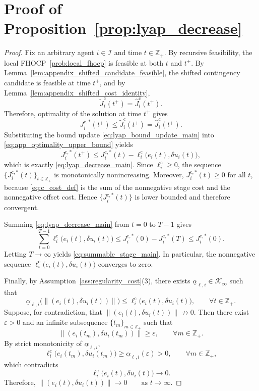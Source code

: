 \documentclass[twocolumn]{autart}
\begin{document}
\section{Proof of Proposition~\ref{prop:lyap_decrease}}

\begin{proof}
Fix an arbitrary agent $i\in\mathcal I$ and time $t\in\mathbb Z_+$.
By recursive feasibility, the local FHOCP~\eqref{prob:local_fhocp} is feasible at both $t$ and $t^+$.
By Lemma~\ref{lem:appendix_shifted_candidate_feasible}, the shifted contingency candidate is feasible at time $t^+$, and by Lemma~\ref{lem:appendix_shifted_cost_identity},
\[
\tilde J_i^{\mathrm c}(t^+)=\hat J_i^{\mathrm c}(t^+).
\]
Therefore, optimality of the solution at time $t^+$ gives
\begin{equation}
J_i^{\mathrm c,\ast}(t^+)
\le
\tilde J_i^{\mathrm c}(t^+)
=
\hat J_i^{\mathrm c}(t^+).
\label{eq:app_optimality_upper_bound}
\end{equation}
Substituting the bound update \eqref{eq:lyap_bound_update_main} into \eqref{eq:app_optimality_upper_bound} yields
\[
J_i^{\mathrm c,\ast}(t^+)
\le
J_i^{\mathrm c,\ast}(t)
-
\ell_i^{\mathrm c}\!\bigl(e_i(t),\delta u_i(t)\bigr),
\]
which is exactly \eqref{eq:lyap_decrease_main}.
Since $\ell_i^{\mathrm c}\ge 0$, the sequence $\{J_i^{\mathrm c,\ast}(t)\}_{t\in\mathbb Z_+}$ is monotonically nonincreasing.
Moreover, $J_i^{\mathrm c,\ast}(t)\ge 0$ for all $t$, because \eqref{eq:c_cost_def} is the sum of the nonnegative stage cost and the nonnegative offset cost.
Hence $\{J_i^{\mathrm c,\ast}(t)\}$ is lower bounded and therefore convergent.

Summing \eqref{eq:lyap_decrease_main} from $t=0$ to $T-1$ gives
\begin{equation}
\sum_{t=0}^{T-1}
\ell_i^{\mathrm c}\!\bigl(e_i(t),\delta u_i(t)\bigr)
\le
J_i^{\mathrm c,\ast}(0)-J_i^{\mathrm c,\ast}(T)
\le
J_i^{\mathrm c,\ast}(0).
\label{eq:app_telescoping_sum}
\end{equation}
Letting $T\to\infty$ yields \eqref{eq:summable_stage_main}.
In particular, the nonnegative sequence
$\ell_i^{\mathrm c}\!\bigl(e_i(t),\delta u_i(t)\bigr)$ converges to zero.

Finally, by Assumption~\ref{ass:regularity_cost}(3), there exists
$\underline{\alpha}_{\ell,i}\in\mathcal K_\infty$ such that
\[
\underline{\alpha}_{\ell,i}\!\bigl(\|(e_i(t),\delta u_i(t))\|\bigr)
\le
\ell_i^{\mathrm c}\!\bigl(e_i(t),\delta u_i(t)\bigr),
\qquad \forall t\in\mathbb Z_+.
\]
Suppose, for contradiction, that $\|(e_i(t),\delta u_i(t))\|\not\to 0$.
Then there exist $\varepsilon>0$ and an infinite subsequence $\{t_m\}_{m\in\mathbb Z_+}$ such that
\[
\|(e_i(t_m),\delta u_i(t_m))\|\ge \varepsilon,
\qquad \forall m\in\mathbb Z_+.
\]
By strict monotonicity of $\underline{\alpha}_{\ell,i}$,
\[
\ell_i^{\mathrm c}\!\bigl(e_i(t_m),\delta u_i(t_m)\bigr)
\ge
\underline{\alpha}_{\ell,i}(\varepsilon)
>0,
\qquad \forall m\in\mathbb Z_+,
\]
which contradicts
\[
\ell_i^{\mathrm c}\!\bigl(e_i(t),\delta u_i(t)\bigr)\to 0.
\]
Therefore,
\(
\|(e_i(t),\delta u_i(t))\|\to 0
\qquad\text{as } t\to\infty.
\)
\end{proof}
\end{document}
